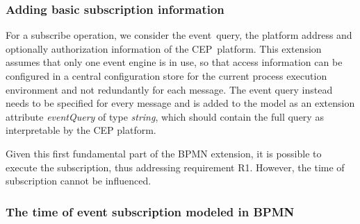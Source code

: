 
\subsubsection*{Adding basic subscription information}\label{ch:bpmnx:basic}

For a subscribe operation, we consider the event~query, the platform address and optionally authorization information of the CEP~platform.
This extension assumes that only one event engine is in use, so that access information can be configured in a central configuration store for the current process execution environment and not redundantly for each message.
The event query instead needs to be specified for every message and is added to the model as an extension attribute \textit{eventQuery} of type \textit{string}, which should contain the full query as interpretable by the CEP platform.

Given this first fundamental part of the BPMN extension, it is possible to execute the subscription, thus addressing requirement R1. However, the time of subscription cannot be influenced.

\subsubsection*{The time of event subscription modeled in BPMN}\label{ch:bpmnx:subscriptiontimes}

